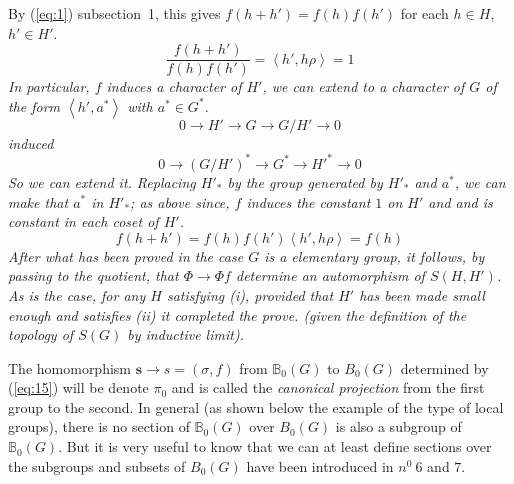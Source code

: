 \documentclass[12pt]{amsart}
\newenvironment{expl}{\it}{\color{black}\normalsize}
\def\bB{{\mathbb{B}}}
\def\bs{{\mathbf{s}}}
\def\inn#1#2{\left\langle{#1},{#2}\right\rangle}
\newcounter{ssection}
\renewcommand{\subsection}{
  \addtocounter{ssection}{1}{\bf  \arabic{ssection}.\  }}
\begin{document}
By (\ref{eq:1}) subsection~1, this gives $f(h + h')=f(h)f(h')$ 
for each $h\in H$, $h' \in H'$.  
\begin{expl}
\[
\frac{f(h+h')}{f(h)f(h')} = \inn{h'}{h\rho} = 1
\]
\end{expl}
In particular, $f$  induces a character of $H'$, we can extend to a
character of $G$  of the form $\inn{h'}{a^*}$ with $a^*\in G^*$. 	
\begin{expl}
\[
0\to H'\to G\to G/H' \to 0
\]
induced 
\[
0 \to (G/H')^* \to G^* \to H'^* \to 0
\]
So we can extend it. 
\end{expl}
Replacing $H'_*$ by the group generated by $H'_*$ and $a^*$,
we can make that $a^*$ in $H'_*$;
\begin{expl}
as above
\end{expl}
since, $f$ induces the constant $1$ on $H'$ and 
and is constant in each coset of $H'$.
\begin{expl}
\[
f(h+h') = f(h)f(h')\inn{h'}{h\rho} = f(h)
\]
\end{expl} 
After what has been proved in the case $G$ is a  elementary group,
it follows, by passing to the quotient,
 that $\Phi\to \Phi f$ determine an automorphism of $S(H, H')$.
As is the case, for any $H$ satisfying (i), provided that $H'$ 
has been made small enough and satisfies (ii) it completed the
prove.
(given the definition of the topology of $S(G)$ by inductive limit).

\subsection{}
The homomorphism $\bs \to s = (\sigma, f)$ from $\bB_0(G)$ to $B_0(G)$
 determined by (\ref{eq:15}) will be denote $\pi_0$
  and is called the {\it canonical projection} 
from the first group to the second.
In general (as shown below the example of the type of local groups), 
there is no section of $\bB_0(G)$ over $B_0(G)$ 
is also a subgroup of $\bB_0 (G)$. 
But it is very useful to know that we can at least define
 sections over the subgroups and
subsets of $B_0(G)$ have been introduced in $n^0~6$ and $7$. 
\end{document}
